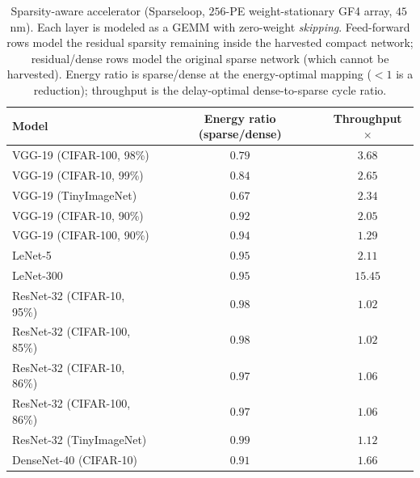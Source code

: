 \begin{table}[t]
  \centering
  \small
  \caption{Sparsity-aware accelerator (Sparseloop, $256$-PE weight-stationary
    GF4 array, $45$\,nm). Each layer is modeled as a GEMM with zero-weight
    \emph{skipping}. Feed-forward rows model the residual sparsity remaining inside
    the harvested compact network; residual/dense rows model the original sparse
    network (which cannot be harvested). Energy ratio is sparse/dense at the
    energy-optimal mapping ($<1$ is a reduction); throughput is the delay-optimal
    dense-to-sparse cycle ratio.}
  \label{tab:sparseloop}
  \begin{tabular}{l c c}
    \toprule
    Model & Energy ratio (sparse/dense) & Throughput $\times$ \\
    \midrule
    VGG-19 (CIFAR-100, 98\%)  & $0.79$ & $3.68$ \\
    VGG-19 (CIFAR-10, 99\%)   & $0.84$ & $2.65$ \\
    VGG-19 (TinyImageNet)     & $0.67$ & $2.34$ \\
    VGG-19 (CIFAR-10, 90\%)   & $0.92$ & $2.05$ \\
    VGG-19 (CIFAR-100, 90\%)  & $0.94$ & $1.29$ \\
    LeNet-5                   & $0.95$ & $2.11$ \\
    LeNet-300                 & $0.95$ & $15.45$ \\
    \midrule
    ResNet-32 (CIFAR-10, 95\%)   & $0.98$ & $1.02$ \\
    ResNet-32 (CIFAR-100, 85\%)  & $0.98$ & $1.02$ \\
    ResNet-32 (CIFAR-10, 86\%)   & $0.97$ & $1.06$ \\
    ResNet-32 (CIFAR-100, 86\%)  & $0.97$ & $1.06$ \\
    ResNet-32 (TinyImageNet)     & $0.99$ & $1.12$ \\
    DenseNet-40 (CIFAR-10)       & $0.91$ & $1.66$ \\
    \bottomrule
  \end{tabular}
\end{table}

